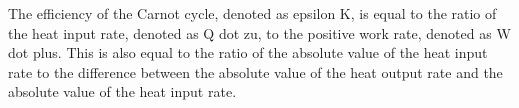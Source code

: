 The efficiency of the Carnot cycle, denoted as epsilon K, is equal to the ratio of the heat input rate, denoted as Q dot zu, to the positive work rate, denoted as W dot plus. This is also equal to the ratio of the absolute value of the heat input rate to the difference between the absolute value of the heat output rate and the absolute value of the heat input rate.